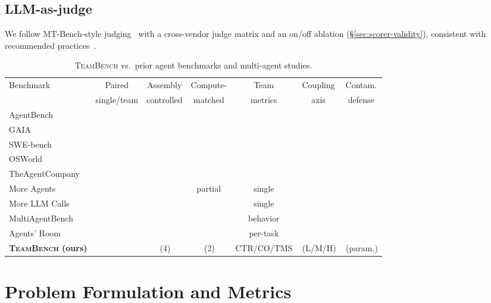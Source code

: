 \documentclass{article}
\newcommand{\teambench}{\textsc{TeamBench}}
\newcommand{\cmark}{\ding{51}}
\newcommand{\xmark}{\ding{55}}
\begin{document}
\subsection{LLM-as-judge}
We follow MT-Bench-style judging~\citep{zheng2023judging} with a cross-vendor judge matrix and an on/off ablation (\S\ref{sec:scorer-validity}), consistent with recommended practices~\citep{guo2024survey}.

\begin{table}[t]
\centering
\caption{\teambench{} vs.\ prior agent benchmarks and multi-agent studies.}
\label{tab:comparison}
\small
\begin{tabular}{lcccccc}
\toprule
Benchmark & Paired & Assembly & Compute- & Team & Coupling & Contam.\\
 & single/team & controlled & matched & metrics & axis & defense \\
\midrule
AgentBench~\citep{liu2023agentbench} & \xmark & \xmark & \xmark & \xmark & \xmark & \xmark \\
GAIA~\citep{mialon2023gaia} & \xmark & \xmark & \xmark & \xmark & \xmark & \xmark \\
SWE-bench~\citep{jimenez2024swebench} & \xmark & \xmark & \xmark & \xmark & \xmark & \xmark \\
OSWorld~\citep{xie2024osworld} & \xmark & \xmark & \xmark & \xmark & \xmark & \xmark \\
TheAgentCompany~\citep{xu2024theagentcompany} & \xmark & \xmark & \xmark & \xmark & \xmark & \xmark \\
More Agents~\citep{li2024moreagents} & \xmark & \xmark & partial & single & \xmark & \xmark \\
More LLM Calls~\citep{chen2024morellmcalls} & \xmark & \xmark & \cmark & single & \xmark & \xmark \\
MultiAgentBench~\citep{zhu2025multiagentbench} & \xmark & \xmark & \xmark & behavior & \xmark & \xmark \\
Agents' Room~\citep{huot2025agentsroom} & \xmark & \xmark & \xmark & per-task & \xmark & \xmark \\
\textbf{\teambench{} (ours)} & \cmark & \cmark\,(4) & \cmark\,(2) & CTR/CO/TMS & \cmark\,(L/M/H) & \cmark\,(param.) \\
\bottomrule
\end{tabular}
\end{table}

\section{Problem Formulation and Metrics}
\label{sec:formulation}
\end{document}
